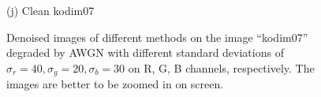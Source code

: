 \documentclass[10pt,onecolumn,letterpaper]{article}
\begin{document}
\begin{figure}
{\begin{minipage}[t]{0.195\textwidth}
{\footnotesize (j) Clean kodim07}
\end{minipage}
}
\caption{Denoised images of different methods on the image ``kodim07'' degraded by AWGN with different standard deviations of $\sigma_{r}=40, \sigma_{g}=20, \sigma_{b}=30$ on R, G, B channels, respectively. The images are better to be zoomed in on screen.}
\label{f1}
\vspace{2mm}
\end{figure}


\begin{figure}\vspace{1mm}
\centering
{}
\end{figure}
\end{document}
